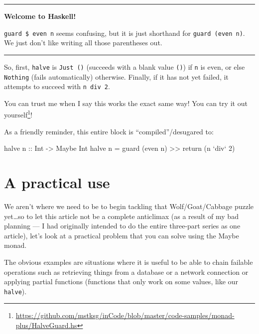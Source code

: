 \documentclass[]{article}
\newenvironment{Shaded}{}{}
\newcommand{\DataTypeTok}[1]{\textcolor[rgb]{0.56,0.13,0.00}{#1}}
\newcommand{\DecValTok}[1]{\textcolor[rgb]{0.25,0.63,0.44}{#1}}
\newcommand{\FunctionTok}[1]{\textcolor[rgb]{0.02,0.16,0.49}{#1}}
\newcommand{\NormalTok}[1]{#1}
\newcommand{\OtherTok}[1]{\textcolor[rgb]{0.00,0.44,0.13}{#1}}
\renewcommand{\href}[2]{#2\footnote{\url{#1}}}
\begin{document}
\begin{center}\rule{0.5\linewidth}{\linethickness}\end{center}

\textbf{Welcome to Haskell!}

\texttt{guard\ \$\ even\ n} seems confusing, but it is just shorthand for
\texttt{guard\ (even\ n)}. We just don't like writing all those parentheses out.

\begin{center}\rule{0.5\linewidth}{\linethickness}\end{center}

So, first, \texttt{halve} is \texttt{Just\ ()} (succeeds with a blank value
\texttt{()}) if \texttt{n} is even, or else \texttt{Nothing} (fails
automatically) otherwise. Finally, if it has not yet failed, it attempts to
succeed with \texttt{n\ \textasciigrave{}div\textasciigrave{}\ 2}.

You can trust me when I say this works the exact same way! You can
\href{https://github.com/mstksg/inCode/blob/master/code-samples/monad-plus/HalveGuard.hs}{try
it out yourself}!

As a friendly reminder, this entire block is ``compiled''/desugared to:

\begin{Shaded}
\begin{Highlighting}[]
\NormalTok{halve}\OtherTok{ n ::} \DataTypeTok{Int} \OtherTok{->} \DataTypeTok{Maybe} \DataTypeTok{Int}
\NormalTok{halve n }\FunctionTok{=}\NormalTok{ guard (even n) }\FunctionTok{>>}\NormalTok{ return (n }\OtherTok{`div`} \DecValTok{2}\NormalTok{)}
\end{Highlighting}
\end{Shaded}

\hypertarget{a-practical-use}{%
\section{A practical use}\label{a-practical-use}}

We aren't where we need to be to begin tackling that Wolf/Goat/Cabbage puzzle
yet\ldots{}so to let this article not be a complete anticlimax (as a result of
my bad planning --- I had originally intended to do the entire three-part series
as one article), let's look at a practical problem that you can solve using the
Maybe monad.

The obvious examples are situations where it is useful to be able to chain
failable operations such as retrieving things from a database or a network
connection or applying partial functions (functions that only work on some
values, like our \texttt{halve}).
\end{document}

